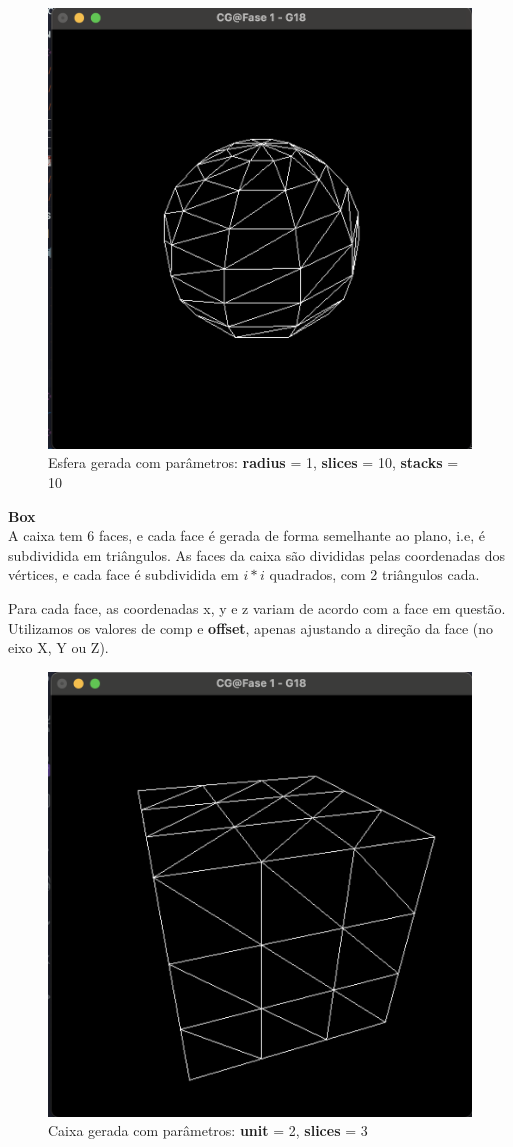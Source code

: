 \documentclass[12pt,a4paper]{report}%
\begin{document}
\begin{figure} [H]
    \centering
    \includegraphics[width=0.5\linewidth]{images/Sphere_1_10_10.png}
    \caption{Esfera gerada com parâmetros: \textbf{radius} = 1, \textbf{slices} = 10, \textbf{stacks} = 10}
    \label{fig:sphere-11010}
\end{figure}

\textbf{Box} \\

A caixa tem 6 faces, e cada face é gerada de forma semelhante ao plano, i.e, é subdividida em triângulos. As faces da caixa são divididas pelas coordenadas dos vértices, e cada face é subdividida em \(i*i\) quadrados, com 2 triângulos cada. 

Para cada face, as coordenadas x, y e z variam de acordo com a face em questão. Utilizamos os valores de comp e \textbf{offset}, apenas ajustando a direção da face (no eixo X, Y ou Z).
\begin{figure} [H]
    \centering
    \includegraphics[width=0.5\linewidth]{images/Box_2_3.png}
    \caption{Caixa gerada com parâmetros: \textbf{unit} = 2, \textbf{slices} = 3}
    \label{fig:box-23}
\end{figure}
\end{document}
